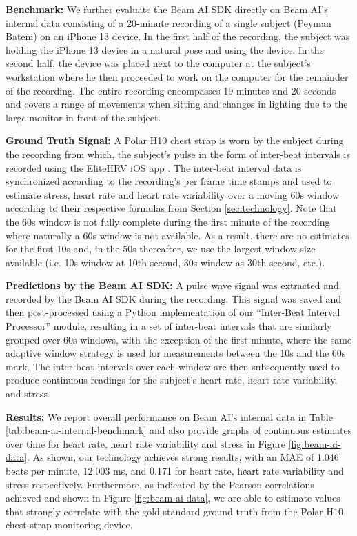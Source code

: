 \documentclass{article}
\begin{document}
\textbf{Benchmark:} We further evaluate the Beam AI SDK directly on Beam AI's internal data consisting of a 20-minute recording of a single subject (Peyman Bateni) on an iPhone 13 device. In the first half of the recording, the subject was holding the iPhone 13 device in a natural pose and using the device. In the second half, the device was placed next to the computer at the subject's workstation where he then proceeded to work on the computer for the remainder of the recording. The entire recording encompasses 19 minutes and 20 seconds and covers a range of movements when sitting and changes in lighting due to the large monitor in front of the subject.

\textbf{Ground Truth Signal:} A Polar H10 chest strap is worn by the subject during the recording from which, the subject's pulse in the form of inter-beat intervals is recorded using the EliteHRV iOS app \cite{elite_hrv_2022}. The inter-beat interval data is synchronized according to the recording's per frame time stamps and used to estimate stress, heart rate and heart rate variability over a moving 60s window according to their respective formulas from Section \ref{sec:technology}. Note that the 60s window is not fully complete during the first minute of the recording where naturally a 60s window is not available. As a result, there are no estimates for the first 10s and, in the 50s thereafter, we use the largest window size available (i.e. 10s window at 10th second, 30s window as 30th second, etc.).

\textbf{Predictions by the Beam AI SDK:} A pulse wave signal was extracted and recorded by the Beam AI SDK during the recording. This signal was saved and then post-processed using a Python implementation of our ``Inter-Beat Interval Processor'' module, resulting in a set of inter-beat intervals that are similarly grouped over 60s windows, with the exception of the first minute, where the same adaptive window strategy is used for measurements between the 10s and the 60s mark. The inter-beat intervals over each window are then subsequently used to produce continuous readings for the subject's heart rate, heart rate variability, and stress.

\textbf{Results:} We report overall performance on Beam AI's internal data in Table \ref{tab:beam-ai-internal-benchmark} and also provide graphs of continuous estimates over time for heart rate, heart rate variability and stress in Figure \ref{fig:beam-ai-data}. As shown, our technology achieves strong results, with an MAE of 1.046 beats per minute, 12.003 ms, and 0.171 for heart rate, heart rate variability and stress respectively. Furthermore, as indicated by the Pearson correlations achieved and shown in Figure \ref{fig:beam-ai-data}, we are able to estimate values that strongly correlate with the gold-standard ground truth from the Polar H10 chest-strap monitoring device.
\end{document}
